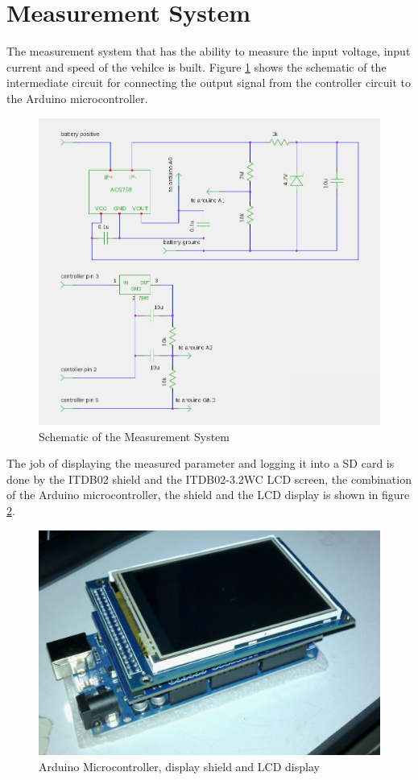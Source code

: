 \section{Measurement System}
The measurement system that has the ability to measure the input voltage, input current and speed of the vehilce is built. Figure \ref{im:sch} shows the schematic of the intermediate circuit for connecting the output signal from the controller circuit to the Arduino microcontroller. 

\begin{figure}[htb]
	\centering
	\includegraphics[width=5in]{images/sch.png}
	\caption{Schematic of the Measurement System}
	\label{im:sch}
\end{figure}

The job of displaying the measured parameter and logging it into a SD card is done by the ITDB02 shield and the ITDB02-3.2WC LCD screen, the combination of the Arduino microcontroller, the shield and the LCD display is shown in figure \ref{im:arduino}.

\begin{figure}[htb]
	\centering
	\includegraphics[width=5in]{images/arduino.jpg}
	\caption{Arduino Microcontroller, display shield and LCD display}
	\label{im:arduino}
\end{figure} \clearpage

